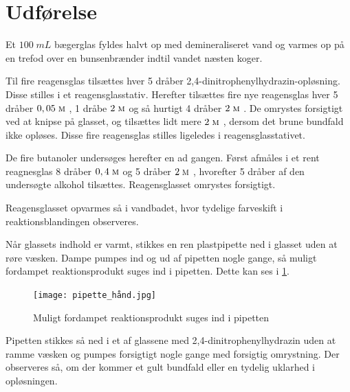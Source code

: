 \documentclass{report}
\begin{document}
\section*{Udførelse}
Et $100 \;\unit{mL} $ bægerglas fyldes halvt op med demineraliseret vand og varmes op på en trefod over en bunsenbrænder indtil vandet næsten koger.

Til fire reagensglas tilsættes hver 5 dråber 2,4-dinitrophenylhydrazin-opløsning. Disse stilles i et reagensglasstativ. 
Herefter tilsættes fire nye reagensglas hver 5 dråber $0,05 \;\unit{\textsc{m}} $ , 1 dråbe $2 \;\unit{\textsc{m}} $  og så hurtigt 4 dråber $2 \;\unit{\textsc{m}} $ . 
De omrystes forsigtigt ved at knipse på glasset, og tilsættes lidt mere $2 \;\unit{\textsc{m}} $ , dersom det brune bundfald ikke opløses. 
Disse fire reagensglas stilles ligeledes i reagensglasstativet.

De fire butanoler undersøges herefter en ad gangen.
Først afmåles i et rent reagnesglas 8 dråber $0,4 \;\unit{\textsc{m}} $  og 5 dråber $2 \;\unit{\textsc{m}} $ , hvorefter 5 dråber af den undersøgte alkohol tilsættes.
Reagensglasset omrystes forsigtigt.

Reagensglasset opvarmes så i vandbadet, hvor tydelige farveskift i reaktionsblandingen observeres.

Når glassets indhold er varmt, stikkes en ren plastpipette ned i glasset uden at røre væsken. 
Dampe pumpes ind og ud af pipetten nogle gange, så muligt fordampet reaktionsprodukt suges ind i pipetten.
Dette kan ses i \cref{fig:hånd_pipette}.
\begin{figure}[H]
\begin{center}
  \texttt{[image: pipette\_hånd.jpg]}
\end{center}
\caption{Muligt fordampet reaktionsprodukt suges ind i pipetten}
\label{fig:hånd_pipette}
\end{figure}
Pipetten stikkes så ned i et af glassene med 2,4-dinitrophenylhydrazin uden at ramme væsken og pumpes forsigtigt nogle gange med forsigtig omrystning.
Der observeres så, om der kommer et gult bundfald eller en tydelig uklarhed i opløsningen.
\end{document}
